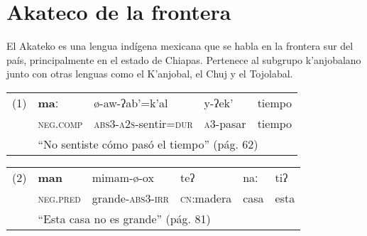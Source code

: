 \section*{Akateco de la frontera }

\noindent El Akateko es una lengua indígena mexicana que se habla en la frontera sur del país, principalmente en el estado de Chiapas. Pertenece al subgrupo k'anjobalano junto con otras lenguas como el K'anjobal, el Chuj y el Tojolabal.


      {\setmainfont{Doulos SIL}
            \begin{table}[H]
                  \begin{tabular}{rllll}
                        \multicolumn{1}{l}{(1)} & \textbf{maː}                                                    & ø-aw-ʔab'=k'al                        & y-ʔek'            & tiempo \\
                                                & \textsc{neg.comp}                                               & \textsc{abs3-a2s}-sentir\textsc{=dur} & \textsc{a3}-pasar & tiempo \\
                                                & \multicolumn{4}{l}{“No sentiste cómo pasó el tiempo” (pág. 62)}                                                                      \\
                  \end{tabular}%
            \end{table}
            \begin{table}[H]
                  \begin{tabular}{rlllll}
                        \multicolumn{1}{l}{(2)} & \textbf{man}                                           & mimam-ø-ox               & teʔ                & naː  & tiʔ  \\
                                                & \textsc{neg.pred}                                      & grande-\textsc{abs3-irr} & \textsc{cn}:madera & casa & esta \\
                                                & \multicolumn{5}{l}{“Esta casa no es grande” (pág. 81)}                                                               \\
                  \end{tabular}%
            \end{table}%
            \begin{table}[H]

\end{table}}

